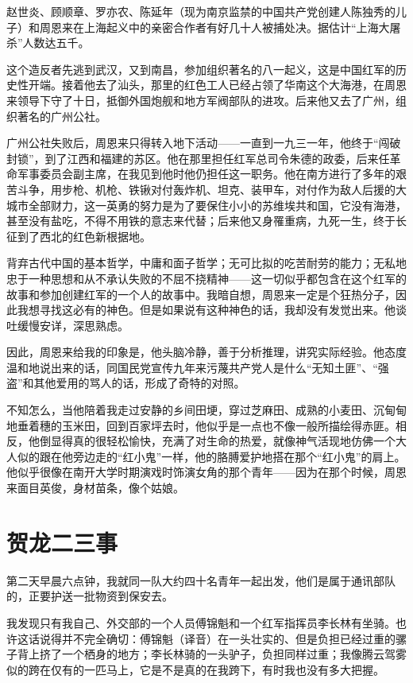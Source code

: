 \documentclass[10pt]{book}
\begin{document}
赵世炎、顾顺章、罗亦农、陈延年（现为南京监禁的中国共产党创建人陈独秀的儿子）和周恩来在上海起义中的亲密合作者有好几十人被捕处决。据估计“上海大屠杀”人数达五千。

这个造反者先逃到武汉，又到南昌，参加组织著名的八一起义，这是中国红军的历史性开端。接着他去了汕头，那里的红色工人已经占领了华南这个大海港，在周恩来领导下守了十日，抵御外国炮舰和地方军阀部队的进攻。后来他又去了广州，组织著名的广州公社。

广州公社失败后，周恩来只得转入地下活动——一直到一九三一年，他终于“闯破封锁”，到了江西和福建的苏区。他在那里担任红军总司令朱德的政委，后来任革命军事委员会副主席，在我见到他时他仍担任这一职务。他在南方进行了多年的艰苦斗争，用步枪、机枪、铁锹对付轰炸机、坦克、装甲车，对付作为敌人后援的大城市全部财力，这一英勇的努力是为了要保住小小的苏维埃共和国，它没有海港，甚至没有盐吃，不得不用铁的意志来代替；后来他又身罹重病，九死一生，终于长征到了西北的红色新根据地。

背弃古代中国的基本哲学，中庸和面子哲学；无可比拟的吃苦耐劳的能力；无私地忠于一种思想和从不承认失败的不屈不挠精神——这一切似乎都包含在这个红军的故事和参加创建红军的一个人的故事中。我暗自想，周恩来一定是个狂热分子，因此我想寻找这必有的神色。但是如果说有这种神色的话，我却没有发觉出来。他谈吐缓慢安详，深思熟虑。

因此，周恩来给我的印象是，他头脑冷静，善于分析推理，讲究实际经验。他态度温和地说出来的话，同国民党宣传九年来污蔑共产党人是什么“无知土匪”、“强盗”和其他爱用的骂人的话，形成了奇特的对照。

不知怎么，当他陪着我走过安静的乡间田埂，穿过芝麻田、成熟的小麦田、沉甸甸地垂着穗的玉米田，回到百家坪去时，他似乎是一点也不像一般所描绘得赤匪。相反，他倒显得真的很轻松愉快，充满了对生命的热爱，就像神气活现地仿佛一个大人似的跟在他旁边走的“红小鬼”一样，他的胳膊爱护地搭在那个“红小鬼”的肩上。他似乎很像在南开大学时期演戏时饰演女角的那个青年——因为在那个时候，周恩来面目英俊，身材苗条，像个姑娘。



\section{贺龙二三事}

第二天早晨六点钟，我就同一队大约四十名青年一起出发，他们是属于通讯部队的，正要护送一批物资到保安去。

我发现只有我自己、外交部的一个人员傅锦魁和一个红军指挥员李长林有坐骑。也许这话说得并不完全确切：傅锦魁（译音）在一头壮实的、但是负担已经过重的骡子背上挤了一个栖身的地方；李长林骑的一头驴子，负担同样过重；我像腾云驾雾似的跨在仅有的一匹马上，它是不是真的在我跨下，有时我也没有多大把握。
\end{document}
